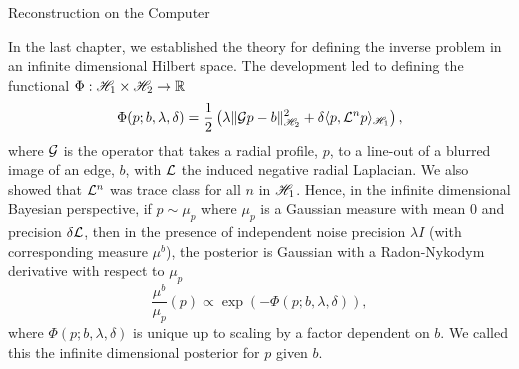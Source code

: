 \setlength{\parindent}{2ex}
\newcommand{\Ab}{{\bf A}}
\newcommand{\N}{\mathcal{N}}
\begin{chapter}{Reconstruction on the Computer}\label{chapter:computational}

In the last chapter, we established the theory for defining the inverse problem in an infinite dimensional Hilbert space. 
The development led to defining the functional $\Phi:\mathscr H_1 \times \mathscr H_2 \to \mathbb R$
\begin{equation} \label{eq:regularizingFunctional}
  \Phi(p; b,\lambda,\delta) = \frac 12 \left(\lambda\|\mathcal G p - b\|_{\mathscr H_2}^2 + \delta\langle p, \mathcal L^n p\rangle_{\mathscr H_1}\right),
\end{equation}
where $\mathcal G$ is the operator that takes a radial profile, $p$, to a line-out of a blurred image of an edge, $b$, with $\mathcal L$ the induced negative radial Laplacian. 
We also showed that $\mathcal L^n$ was trace class for all $n$ in $\mathscr H_1$. %
Hence, in the infinite dimensional Bayesian perspective, if $p\sim \mu_p$ where $\mu_p$ is a Gaussian measure with mean $0$ and precision $\delta \mathcal L$, then in the presence of independent noise precision $\lambda I$ (with corresponding measure $\mu^b$), the posterior is Gaussian with a Radon-Nykodym derivative with respect to $\mu_p$
\begin{equation} \label{eq:posteriorInfinite}
  \frac{\mu^b}{\mu_p}(p) \propto \exp\left(-\Phi(p;b,\lambda,\delta)\right),
\end{equation}
where $\Phi(p;b,\lambda,\delta)$ is unique up to scaling by a factor dependent on $b$.
We called this the infinite dimensional posterior for $p$ given $b$.


\end{chapter}
